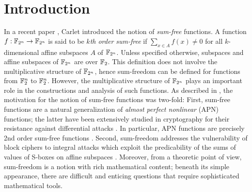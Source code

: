 \documentclass{amsart}
\numberwithin{equation}{section}
\theoremstyle{definition}
\newcommand{\f}{\Bbb F}
\begin{document}
\maketitle

\section{Introduction}

In a recent paper \cite{Carlet-0}, Carlet introduced the notion of {\em sum-free} functions. A function $f: \f_{2^n}\to\f_{2^n}$ is said to be {\em$k$th order sum-free} if $\sum_{x\in A}f(x)\ne 0$ for all $k$-dimensional affine subspaces $A$ of $\f_{2^n}$. Unless specified otherwise, subspaces and affine subspaces of $\f_{2^n}$ are over $\f_2$. This definition does not involve the multiplicative structure of $\f_{2^n}$, hence sum-freedom can be defined for functions from $\f_2^n$ to $\f_2^n$. However, the multiplicative structure of $\f_{2^n}$ plays an important role in the constructions and analysis of such functions. As described in \cite{Carlet-0}, the motivation for the notion of sum-free functions was two-fold: First, sum-free functions are a natural generalization of {\em almost perfect nonlinear} (APN) functions; the latter have been extensively studied in cryptography for their resistance against differential attacks \cite{Blondeau-Nyberg-FFA-2015,Carlet-2021,Carlet-Charpin-Zinoviev-DCC-1998,Nyberg-LNCS-1992,Nyberg-LNCS-1994,Nyberg-Knudsen-LNCS-1993}. In particular, APN functions are precisely 2nd order sum-free functions \cite{Hou-DAM-2006}. Second, sum-freedom addresses the vulnerability of block ciphers to integral attacks which exploit the predicability of the sums of values of S-boxes on affine subspaces \cite{Knudsen-Wagner-LNCS-2002,Zaba-Raddum-Henricksen-Dawson-LNCS-2008}. Moreover, from a theoretic point of view, sum-freedom is a notion with rich mathematical content; beneath its simple appearance, there are difficult and enticing questions that require sophisticated mathematical tools. 
\end{document}
